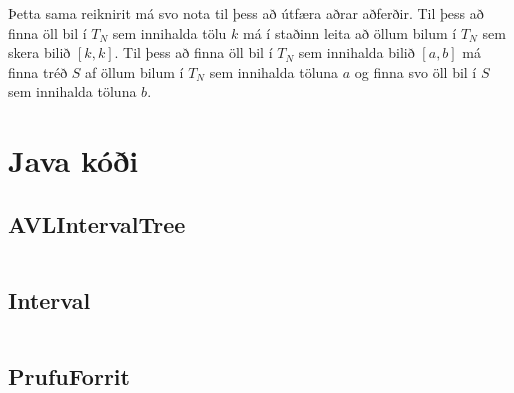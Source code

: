 \documentclass[a4paper,oneside]{article}
\begin{document}
\noindent
Þetta sama reiknirit má svo nota til þess að útfæra aðrar aðferðir.
Til þess að finna öll bil í $T_N$ sem innihalda tölu $k$ má í staðinn leita að öllum bilum í $T_N$ sem skera bilið $[k,k]$.
Til þess að finna öll bil í $T_N$ sem innihalda bilið $[a,b]$ má finna tréð $S$ af öllum bilum í $T_N$ sem innihalda töluna $a$ og finna svo öll bil í $S$ sem innihalda töluna $b$.




\section{Java kóði}
\subsection{AVLIntervalTree}
\inputminted[]{java}{../AVLIntervalTree.java}

\subsection{Interval}
\inputminted[]{java}{../Interval.java}

\subsection{PrufuForrit}
\inputminted[]{java}{../PrufuForrit.java}
\end{document}
